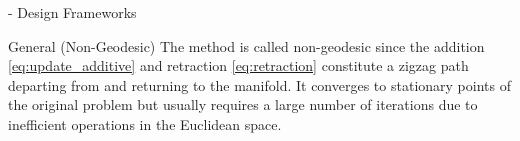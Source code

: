 \documentclass[journal]{IEEEtran}
\begin{document}
\begin{section}{- Design Frameworks}
\begin{subsection}{General (Non-Geodesic) }
		The method is called non-geodesic since the addition \eqref{eq:update_additive} and retraction \eqref{eq:retraction} constitute a zigzag path departing from and returning to the manifold.
		It converges to stationary points of the original problem but usually requires a large number of iterations due to inefficient operations in the Euclidean space.
	\end{subsection}



\end{section}
\end{document}
